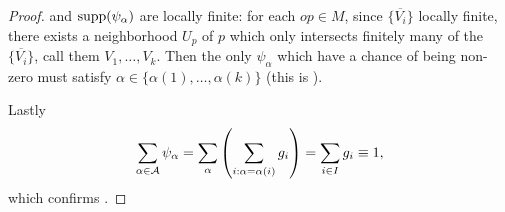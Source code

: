 \begin{proof}
    and 
    \(\text{supp}(\psi_\alpha)\) are locally finite: for each \(op\in M\), since \(\{\overline{V_i}\}\) locally finite,
    there exists a neighborhood \(U_p\) of \(p\)  which only intersects finitely many of the \(\{\overline{V_i}\}\), call 
    them \(V_1,\dots,V_k\). Then the only \(\psi_\alpha\) which have a chance of being non-zero must satisfy \(\alpha\in\{\alpha(1),\dots,\alpha(k)\}\) (this is ).

    Lastly \[\sum_{\alpha\in\mathcal{A}}\psi_\alpha=\sum_{\alpha}\left(\sum_{i: \alpha=\alpha(i)} g_i\right)=\sum_{i\in I} g_i\equiv 1,\]
    which confirms .

\end{proof}